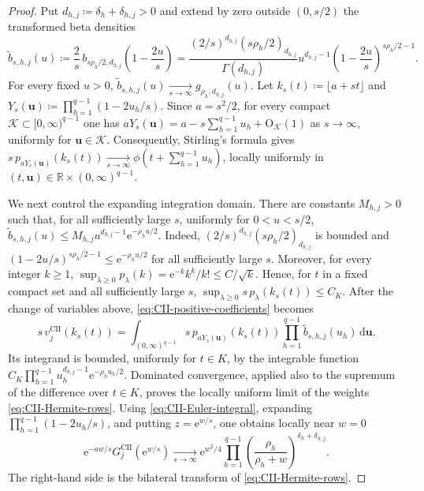 \documentclass[10pt]{amsart}
\newcommand{\R}{\mathbb R}
\newcommand{\e}{\mathrm e}
\newcommand{\dd}{\,\mathrm d}
\theoremstyle{plain}
\theoremstyle{definition}
\theoremstyle{remark}
\begin{document}
\begin{proof}
Put \(d_{h,j}\coloneq\delta_h+\delta_{h,j}>0\) and extend by zero outside
\((0,s/2)\) the transformed beta densities
\[
 \widetilde b_{s,h,j}(u)
 \coloneq\frac2s\,b_{s\rho_h/2,d_{h,j}}\!\left(1-\frac{2u}{s}\right)
 =\frac{(2/s)^{d_{h,j}}(s\rho_h/2)_{d_{h,j}}}{\Gamma(d_{h,j})}
 u^{d_{h,j}-1}
 \left(1-\frac{2u}{s}\right)^{s\rho_h/2-1}.
\]
For every fixed \(u>0\),
\(\widetilde b_{s,h,j}(u)
\xrightarrow[s\to\infty]{}g_{\rho_h,d_{h,j}}(u)\). Let
\(k_s(t)\coloneq\lfloor a+st\rfloor\) and
\(Y_s(\boldsymbol u)\coloneq\prod_{h=1}^{q-1}(1-2u_h/s)\).
Since \(a=s^2/2\), for every compact
\(\mathcal K\subset[0,\infty)^{q-1}\) one has
\(aY_s(\boldsymbol u)
=a-s\sum_{h=1}^{q-1}u_h+\mathrm O_{\mathcal K}(1)\) as \(s\to\infty\),
uniformly for \(\boldsymbol u\in\mathcal K\). Consequently,
Stirling's formula gives
\(s\,p_{aY_s(\boldsymbol u)}(k_s(t))
\xrightarrow[s\to\infty]{}
\phi\left(t+\sum_{h=1}^{q-1}u_h\right)\),
locally uniformly in
\((t,\boldsymbol u)\in\R\times(0,\infty)^{q-1}\).

We next control the expanding integration domain.  There are constants
\(M_{h,j}>0\) such that, for all sufficiently large \(s\), uniformly for
\(0<u<s/2\),
\(\widetilde b_{s,h,j}(u)
\le M_{h,j}u^{d_{h,j}-1}\e^{-\rho_hu/2}\).
Indeed, \((2/s)^{d_{h,j}}(s\rho_h/2)_{d_{h,j}}\) is bounded and
\((1-2u/s)^{s\rho_h/2-1}\le\e^{-\rho_hu/2}\)
for all sufficiently large \(s\). Moreover, for every integer \(k\ge1\),
\(\sup_{\lambda\ge0}p_\lambda(k)
=\e^{-k}k^k/k!\le C/\sqrt{k}\).
Hence, for \(t\) in a fixed compact set and all sufficiently large \(s\),
\(\sup_{\lambda\ge0}s\,p_\lambda(k_s(t))\le C_K\). After the change of
variables above, \eqref{eq:CII-positive-coefficients} becomes
\[
 s\,v_j^{\mathrm{CII}}(k_s(t))
 =\int_{(0,\infty)^{q-1}}
 s\,p_{aY_s(\boldsymbol u)}(k_s(t))
 \prod_{h=1}^{q-1}\widetilde b_{s,h,j}(u_h)\dd\boldsymbol u.
\]
Its integrand is bounded, uniformly for \(t\in K\), by the integrable
function \(C_K\prod_{h=1}^{q-1}u_h^{d_{h,j}-1}\e^{-\rho_hu_h/2}\).
Dominated convergence, applied also to the supremum of the difference over
\(t\in K\), proves the locally uniform limit of the weights
\eqref{eq:CII-Hermite-rows}.
Using \eqref{eq:CII-Euler-integral}, expanding
\(\prod_{h=1}^{q-1}(1-2u_h/s)\), and putting \(z=\e^{w/s}\), one obtains
locally near \(w=0\)
\[
 \e^{-aw/s}G_j^{\mathrm{CII}}(\e^{w/s})
 \xrightarrow[s\to\infty]{}
 \e^{w^2/4}
 \prod_{h=1}^{q-1}\left(\frac{\rho_h}{\rho_h+w}\right)^{
 \delta_h+\delta_{h,j}}.
\]
The right-hand side is the bilateral transform of
\eqref{eq:CII-Hermite-rows}.


\end{proof}
\end{document}
